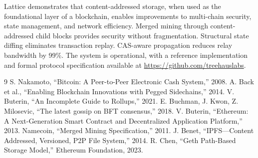 \documentclass[11pt,a4paper]{article}
\begin{document}
Lattice demonstrates that content-addressed storage, when used as the foundational layer of a blockchain, enables improvements to multi-chain security, state management, and network efficiency. Merged mining through content-addressed child blocks provides security without fragmentation. Structural state diffing eliminates transaction replay. CAS-aware propagation reduces relay bandwidth by 99\%. The system is operational, with a reference implementation and formal protocol specification available at \url{https://github.com/treehauslabs}.

\begin{thebibliography}{9}
 S. Nakamoto, ``Bitcoin: A Peer-to-Peer Electronic Cash System,'' 2008.
 A. Back et al., ``Enabling Blockchain Innovations with Pegged Sidechains,'' 2014.
 V. Buterin, ``An Incomplete Guide to Rollups,'' 2021.
 E. Buchman, J. Kwon, Z. Milosevic, ``The latest gossip on BFT consensus,'' 2018.
 V. Buterin, ``Ethereum: A Next-Generation Smart Contract and Decentralized Application Platform,'' 2013.
 Namecoin, ``Merged Mining Specification,'' 2011.
 J. Benet, ``IPFS---Content Addressed, Versioned, P2P File System,'' 2014.
 R. Chen, ``Geth Path-Based Storage Model,'' Ethereum Foundation, 2023.
\end{thebibliography}
\end{document}

